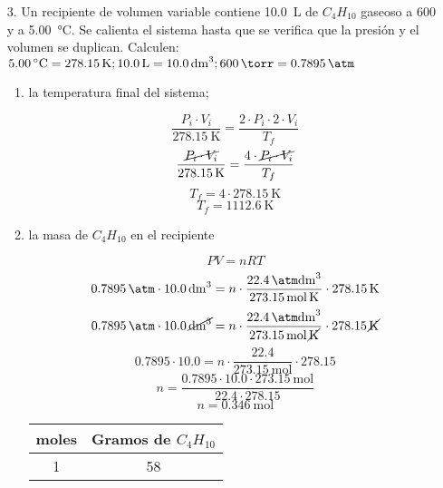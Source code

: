 \documentclass[../practica.root.tex]{subfiles}
\begin{document}
\begin{enumerate}
	\item[3.] Un recipiente de volumen variable contiene \SI{10,0}{\liter} de $C_4H_{10}$ gaseoso a \SI{600}{\torr} y a \SI{5,00}{\celsius}.
	      Se calienta el sistema hasta que se verifica que la presión y el volumen se duplican.
	      Calculen: \\
	      $ \SI{5,00}{\celsius} = \SI{278,15}{\kelvin}; \SI{10,0}{\liter} = \SI{10,0}{\dm\cubed}; \SI{600}{\torr} = \SI{0,7895}{\atm} $
	      \begin{enumerate}
		      \item la temperatura final del sistema;
		            \begin{center}
			            \[ \frac{P_i\cdot V_i}{\SI{278,15}{\kelvin}}
				            = \frac{\num{2}\cdot P_i\cdot \num{2}\cdot V_i}{T_f}  \]
			            \[ \frac{\cancel{P_i\cdot V_i}}{\SI{278,15}{\kelvin}}
				            = \frac{\num{4}\cdot\cancel{P_i\cdot V_i}}{T_f}  \]
			            \[ T_f = \num{4}\cdot\SI{278,15}{\kelvin} \]
			            \[ \boxed{T_f = \SI{1112,6}{\kelvin}} \]
		            \end{center}
		      \item la masa de $C_4H_{10}$ en el recipiente
		            \begin{center}
			            \[ PV = nRT \]
			            \[
				            \SI{0,7895}{\atm}\cdot\SI{10,0}{\dm\cubed}
				            = n
				            \cdot\frac{\SI{22,4}{\atm\dm\cubed}}{\SI{273,15}{\mole\kelvin}}
				            \cdot\SI{278,15}{\kelvin}
			            \]
			            \[
				            \SI{0,7895}{\cancel\atm}\cdot\SI{10,0}{\cancel\dm\cubed}
				            = n
				            \cdot\frac{\SI{22,4}{\cancel\atm\cancel\dm\cubed}}{\SI{273,15}{\mole\cancel\kelvin}}
				            \cdot\SI{278,15}{\cancel\kelvin}
			            \]
			            \[
				            \num{0,7895}\cdot\num{10,0}
				            = n
				            \cdot\frac{\num{22,4}}{\SI{273,15}{\mole}}
				            \cdot\num{278,15}
			            \]
			            \[
				            n =
				            \frac{
					            \num{0,7895}\cdot\num{10,0}\cdot\SI{273,15}{\mole}
				            }{
					            \num{22,4}\cdot\num{278,15}
				            }
			            \]
			            \[ n = \SI{0,346}{\mole} \]
			            \begin{tabular}{ c | c }
				            moles       & Gramos de $C_4H_{10}$ \\
				            \hline
				            1           & 58                    \\

\end{tabular}
\end{center}
\end{enumerate}
\end{enumerate}
\end{document}
